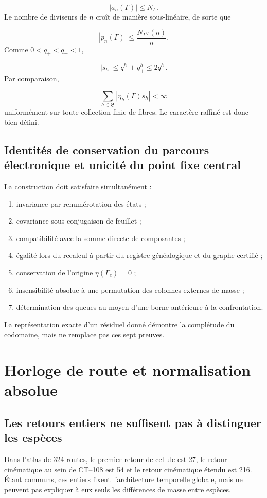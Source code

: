 \[
 |a_n(\Gamma)|\le N_\Gamma.
\]
Le nombre de diviseurs de \(n\) croît de manière sous-linéaire, de sorte que

\[
 |p_n(\Gamma)|
 \le\frac{N_\Gamma\tau(n)}n.
\]
Comme \(0<q_+<q_-<1\),

\[
 |s_h|\le q_-^h+q_+^h\le2q_-^h.
\]
Par comparaison,

\[
 \sum_{h\in\mathfrak S}|\eta_h(\Gamma)s_h|<\infty
\]
uniformément sur toute collection finie de fibres. Le caractère raffiné est donc bien défini.

\subsection{Identités de conservation du parcours électronique et unicité du point fixe central}
La construction doit satisfaire simultanément :

\begin{enumerate}
\item invariance par renumérotation des états ;
\item covariance sous conjugaison de feuillet ;
\item compatibilité avec la somme directe de composantes ;
\item égalité lors du recalcul à partir du registre généalogique et du graphe certifié ;
\item conservation de l’origine \(\eta(\Gamma_e)=0\) ;
\item insensibilité absolue à une permutation des colonnes externes de masse ;
\item détermination des queues au moyen d’une borne antérieure à la confrontation.
\end{enumerate}
La représentation exacte d’un résiduel donné démontre la complétude du codomaine, mais ne remplace pas ces sept preuves.

\section{Horloge de route et normalisation absolue}
\subsection{Les retours entiers ne suffisent pas à distinguer les espèces}
Dans l’atlas de 324 routes, le premier retour de cellule est 27, le retour cinématique au sein de CT--108 est 54 et le retour cinématique étendu est 216. Étant communs, ces entiers fixent l’architecture temporelle globale, mais ne peuvent pas expliquer à eux seuls les différences de masse entre espèces.

